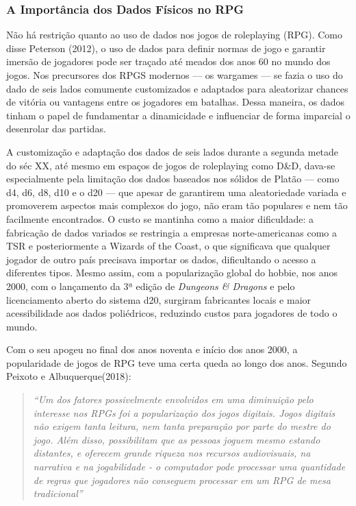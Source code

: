 \subsubsection{A Importância dos Dados Físicos no RPG}
Não há restrição quanto ao uso de dados nos jogos de roleplaying (RPG). Como disse Peterson (2012), o uso de dados para definir 
normas de jogo e garantir imersão de jogadores pode ser traçado até meados dos anos 60 no mundo dos jogos. Nos precursores dos 
RPGS modernos — os wargames — se fazia o uso do dado de seis lados comumente customizados e adaptados para aleatorizar chances de 
vitória ou vantagens entre os jogadores em batalhas. Dessa maneira, os dados tinham o papel de fundamentar a dinamicidade e 
influenciar de forma imparcial o desenrolar das partidas.

A customização e adaptação dos dados de seis lados durante a segunda metade do séc XX, até mesmo em espaços de jogos de roleplaying 
como D\&D, dava-se especialmente pela limitação dos dados baseados nos sólidos de Platão — como d4, d6, d8, d10 e o d20 — que apesar 
de garantirem uma aleatoriedade variada e promoverem aspectos mais complexos do jogo, não eram tão populares e nem tão facilmente 
encontrados. O custo se mantinha como a maior dificuldade: a fabricação de dados variados se restringia a empresas norte-americanas 
como a TSR e posteriormente a Wizards of the Coast, o que significava que qualquer jogador de outro país precisava importar os dados, 
dificultando o acesso a diferentes tipos. Mesmo assim, com a popularização global do hobbie, nos anos 2000, com o lançamento da 3ª 
edição de \textit{Dungeons \& Dragons} e pelo licenciamento aberto do sistema d20, surgiram fabricantes locais e maior acessibilidade 
aos dados poliédricos, reduzindo custos para jogadores de todo o mundo.

Com o seu apogeu no final dos anos noventa e início dos anos 2000, a popularidade de jogos de RPG teve uma certa 
queda ao longo dos anos. Segundo Peixoto e Albuquerque(2018): \cite{peixoto_albuquerque_2018}

\begin{quote}
\textit{“Um dos fatores possivelmente envolvidos em uma diminuição pelo interesse nos RPGs foi a popularização dos jogos digitais. 
Jogos digitais não exigem tanta leitura, nem tanta preparação por parte do mestre do jogo. Além disso, possibilitam que as 
pessoas joguem mesmo estando distantes, e oferecem grande riqueza nos recursos audiovisuais, na narrativa e na jogabilidade 
- o computador pode processar uma quantidade de regras que jogadores não conseguem processar em um RPG de mesa tradicional”}
\end{quote}


